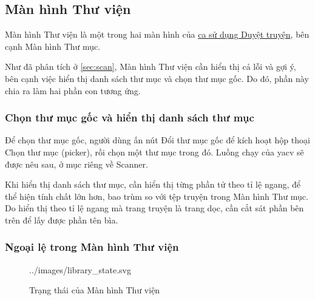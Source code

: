 \documentclass[../../../../thesis]{subfiles}
\begin{document}

\subsection{Màn hình Thư viện}\label{sec:library-design}

Màn hình Thư viện là một trong hai màn hình của \hyperref[sec:browsing]{ca sử
dụng Duyệt truyện}, bên cạnh Màn hình Thư mục.

Như đã phân tích ở \autoref{sec:scan}, Màn hình Thư viện cần hiển thị cả lỗi và
gợi ý, bên cạnh việc hiển thị danh sách thư mục và chọn thư mục gốc. Do đó, phần
này chia ra làm hai phần con tương ứng.

\subsubsection{Chọn thư mục gốc và hiển thị danh sách thư mục}

Để chọn thư mục gốc, người dùng ấn nút Đổi thư mục gốc để kích hoạt hộp thoại
Chọn thư mục (picker), rồi chọn một thư mục trong đó. Luồng chạy của yacv sẽ
được nêu sau, ở mục riêng về Scanner.

Khi hiển thị danh sách thư mục, cần hiển thị từng phần tử theo tỉ lệ ngang, để
thể hiện tính chất lớn hơn, bao trùm so với tệp truyện trong Màn hình Thư mục.
Do hiển thị theo tỉ lệ ngang mà trang truyện là trang dọc, cần cắt sát phần bên
trên để lấy được phần tên bìa.

%     

\subsubsection{Ngoại lệ trong Màn hình Thư viện}

\begin{wrapfigure}[12]{r}{10cm}
    \centering
    
        {../images/library_state.svg}
    \caption{Trạng thái của Màn hình Thư viện}
    \label{fig:library_state}
\end{wrapfigure}
\end{document}
